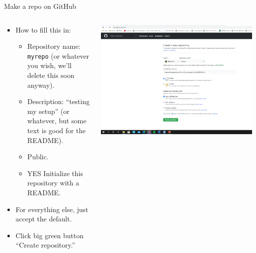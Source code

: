 \documentclass[
  ignorenonframetext,
]{beamer}
\providecommand{\tightlist}{%
  \setlength{\itemsep}{0pt}\setlength{\parskip}{0pt}}
\begin{document}
\begin{frame}[fragile]{Make a repo on GitHub}
\protect\hypertarget{make-a-repo-on-github-1}{}

\begin{columns}[T]
\begin{column}{0.48\textwidth}
\begin{itemize}
\tightlist
\item
  How to fill this in:

  \begin{itemize}
  \tightlist
  \item
    Repository name: \texttt{myrepo} (or whatever you wish, we'll delete
    this soon anyway).
  \item
    Description: ``testing my setup'' (or whatever, but some text is
    good for the README).
  \item
    Public.
  \item
    YES Initialize this repository with a README.
  \end{itemize}
\item
  For everything else, just accept the default.
\item
  Click big green button ``Create repository.''
\end{itemize}
\end{column}

\begin{column}{0.48\textwidth}
\includegraphics{pres_figs/new_repo_main.png}
\end{column}
\end{columns}

\end{frame}
\end{document}
